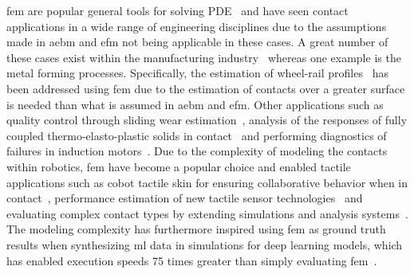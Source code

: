 \gls{fem} are popular general tools for solving PDE~\cite{history-of-finite-element-method:-a-review} and have seen contact applications in a wide range of engineering disciplines due to the assumptions made in \gls{aebm} and \gls{efm} not being applicable in these cases. A great number of these cases exist within the manufacturing industry~\cite{examples-of-fem-application-in-manufacturing-technology} whereas one example is the metal forming processes. Specifically, the estimation of wheel-rail profiles~\cite{contact-mechanics-analysis-of-measured-wheel-rail-profiles-using-the-finite-element-method} has been addressed using \gls{fem} due to the estimation of contacts over a greater surface is needed than what is assumed in \gls{aebm} and \gls{efm}. Other applications such as quality control through sliding wear estimation~\cite{simulating-sliding-wear-with-finite-element-method}, analysis of the responses of fully coupled thermo-elasto-plastic solids in contact~\cite{a-finite-element-procedure-for-the-analysis-of-thermo-mechanical-solids-in-contact} and performing diagnostics of failures in induction motors~\cite{induction-motors-fault-diagnosis-using-finite-element-method:-a-review}. Due to the complexity of modeling the contacts within robotics, \gls{fem} have become a popular choice and enabled tactile applications such as \gls{cobot} tactile skin for ensuring collaborative behavior when in contact~\cite{soft-robot-skin-with-conformal-adaptability-for-on-body-tactile-perception-of-collaborative-robots}, performance estimation of new tactile sensor technologies~\cite{design-and-experimental-research-of-robot-finger-sliding-tactile-sensor-based-on-fbg} and evaluating complex contact types by extending simulations and analysis systems~\cite{grasp-analysis-using-deformable-fingers}.
The modeling complexity has furthermore inspired using \gls{fem} as ground truth results when synthesizing \gls{ml} data in simulations for deep learning models, which has enabled execution speeds \num{75} times greater than simply evaluating \gls{fem}~\cite{sim-to-real-for-robotic-tactile-sensing-via-physics-based-simulation-and-learned-latent-projections, interpreting-and-predicting-tactile-signals-via-a-physics-based-and-data-driven-framework, ground-truth-force-distribution-for-learning-based-tactile-sensing:-a-finite-element-approach}. \medskip


